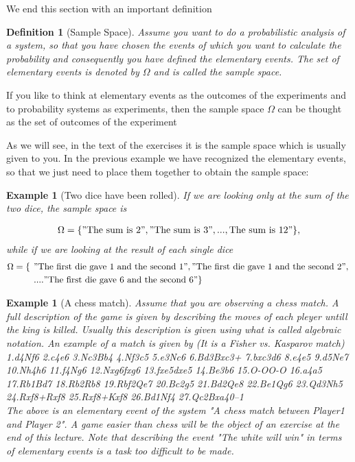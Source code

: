 \documentclass[12pt]{article}
\newtheorem{definition}[theorem]{Definition}
\newtheorem{example}[theorem]{Example}
\newcommand{\<}{{\langle \!\! \langle}}
\renewcommand{\>}{{\rangle \!\! \rangle}}
\newcommand{\bel}[2]{\begin{equation} \label{#1} \begin{split} #2
 					\end{split} \end{equation}}
\newcommand{\commento}[1]{
	\par\noindent
	\colorbox{light}{\begin{minipage}{120 mm}#1\end{minipage}}
	\par\noindent
}
\begin{document}
We end this section with an important definition
\begin{definition}[Sample Space]
Assume you want to do a probabilistic analysis of a system, so that you have chosen the events of which you want to calculate the probability and consequently you have defined the elementary events. The set of elementary events is denoted by $\Omega$ and is called the sample space.
\end{definition}

\commento{If you like to think at elementary events as the outcomes of the experiments and to probability systems as experiments, then the sample space $\Omega$ can be thought as the set of outcomes of the experiment} 
As we will see, in the text of the exercises it is the sample space which is usually given to you. 
In the previous example we have recognized the elementary events, so that we just need to place them together to obtain the sample space: 

\begin{example}[Two dice have been rolled]
If we are looking only at the sum of the two dice, the sample space is 

\bel{}{ \Omega=\{ " \textrm{The sum is 2}"," \textrm{The sum is 3}",..., \textrm{The sum is 12}"\},
}
while if we are looking at the result of each single dice 
\bel{}{
	\Omega  =  \left\{ \right. & \left. " \textrm{The first die gave 1 and the second 1}"," \textrm{The first die gave 1 and the second 2}", \right. \\
	& \left. ...." \textrm{The first die gave 6 and the second 6}"\right\}
} 
\end{example}



\begin{example}[A chess match]
Assume that you are observing a chess match. A full description of the game is given by describing the moves of each pleyer untill the king is killed. Usually this description is given using what is called algebraic notation. An example of a match is given by (It is a Fisher vs. Kasparov match) \\
1.d4Nf6 2.c4e6 3.Nc3Bb4 4.Nf3c5 5.e3Nc6 6.Bd3Bxc3+ 7.bxc3d6 8.e4e5 9.d5Ne7 10.Nh4h6 11.f4Ng6 12.Nxg6fxg6 13.fxe5dxe5 14.Be3b6 15.O-OO-O 16.a4a5 17.Rb1Bd7 18.Rb2Rb8 19.Rbf2Qe7 20.Bc2g5 21.Bd2Qe8 22.Be1Qg6 23.Qd3Nh5 24.Rxf8+Rxf8 25.Rxf8+Kxf8 26.Bd1Nf4 27.Qc2Bxa40–1\\
	The above is an elementary event of the system "A chess match between Player1 and Player 2". A game easier than chess will be the object of an exercise at the end of this lecture. Note that describing the event "The white will win" in terms of elementary events is a task too difficult to be made.   

\end{example}
\end{document}
